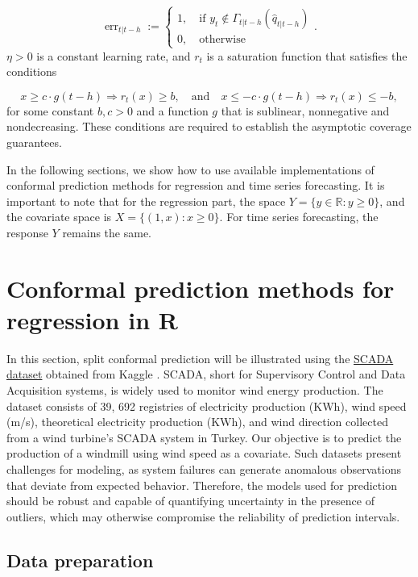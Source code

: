 \[
\operatorname{err}_{t\lvert t-h}:=\begin{cases}
1,\quad \text{if } y_t\notin \Gamma_{t\lvert t-h}(\hat{q}_{t\lvert t-h})\\
0, \quad\text{otherwise}
\end{cases}.
\] \(\eta>0\) is a constant learning rate, and \(r_t\) is a saturation
function that satisfies the conditions

\[
x\geq c\cdot g(t-h)\Rightarrow r_t(x)\geq b,\quad \text{and}\quad x\leq -c\cdot g(t-h)\Rightarrow r_t(x)\leq-b,
\]for some constant \(b,c>0\) and a function \(g\) that is sublinear,
nonnegative and nondecreasing. These conditions are required to
establish the asymptotic coverage guarantees.

In the following sections, we show how to use available implementations
of conformal prediction methods for regression and time series
forecasting. It is important to note that for the regression part, the
space \(Y = \{y\in \mathbb{R}: y\geq 0\}\), and the covariate
space is \(X = \{(1,x): x\geq 0 \}\). For time series
forecasting, the response \(Y\) remains the same.

\section{Conformal prediction methods for regression in R}\label{conformal-prediction-methods-for-regression-in-r}

In this section, split conformal prediction will be illustrated using
the \href{https://github.com/uriel278/tutorials-cp/tree/main}{SCADA dataset}
obtained from Kaggle \citep{windtur}. SCADA, short for Supervisory Control
and Data Acquisition systems, is widely used to monitor wind energy
production. The dataset consists of 39, 692 registries of electricity
production (KWh), wind speed (m/s), theoretical electricity production
(KWh), and wind direction collected from a wind turbine's SCADA system
in Turkey. Our objective is to predict the production of a windmill
using wind speed as a covariate. Such datasets present challenges for
modeling, as system failures can generate anomalous observations that
deviate from expected behavior. Therefore, the models used for
prediction should be robust and capable of quantifying uncertainty in
the presence of outliers, which may otherwise compromise the reliability
of prediction intervals.

\subsection{Data preparation}\label{data-preparation}

